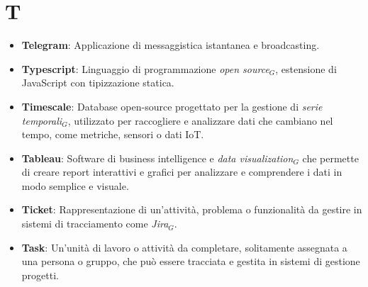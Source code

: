 \section{T}
\begin{itemize}
    \item \textbf{Telegram}: Applicazione di messaggistica istantanea e broadcasting.
    \item \textbf{Typescript}: Linguaggio di programmazione \textit{open source}$_G$, estensione di JavaScript con tipizzazione statica.
    \item \textbf{Timescale}: Database open-source progettato per la gestione di \textit{serie temporali$_G$}, utilizzato per raccogliere e analizzare dati che cambiano nel tempo, come metriche, sensori o dati IoT.
    \item \textbf{Tableau}: Software di business intelligence e \textit{data visualization$_G$} che permette di creare report interattivi e grafici per analizzare e comprendere i dati in modo semplice e visuale.
     \item \textbf{Ticket}: Rappresentazione di un’attività, problema o funzionalità da gestire in sistemi di tracciamento come \textit{Jira}$_G$.
     \item \textbf{Task}: Un'unità di lavoro o attività da completare, solitamente assegnata a una persona o gruppo, che può essere tracciata e gestita in sistemi di gestione progetti.

\end{itemize}
